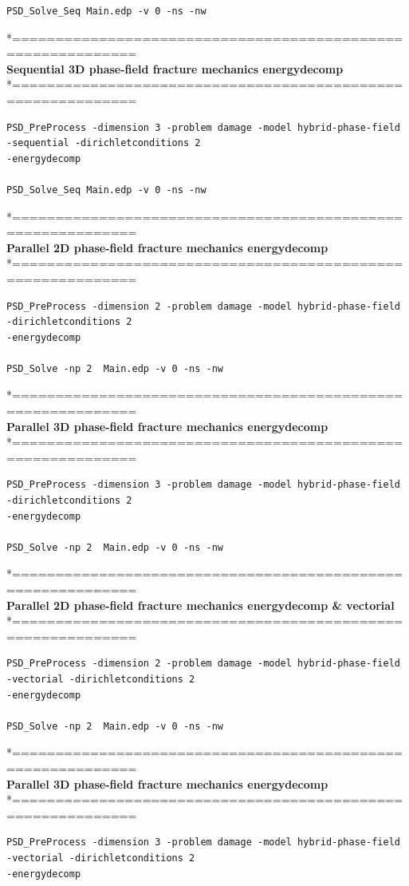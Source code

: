 {{\begin{lstlisting}[style=Linux]
PSD_Solve_Seq Main.edp -v 0 -ns -nw   
\end{lstlisting}
*============================================================\\
\textbf{ Sequential 3D phase-field fracture mechanics energydecomp }\\
*============================================================\\
\begin{lstlisting}[style=Linux]
PSD_PreProcess -dimension 3 -problem damage -model hybrid-phase-field -sequential -dirichletconditions 2 
-energydecomp   

PSD_Solve_Seq Main.edp -v 0 -ns -nw   
\end{lstlisting}
*============================================================\\
\textbf{ Parallel 2D phase-field fracture mechanics energydecomp }\\
*============================================================\\
\begin{lstlisting}[style=Linux]
PSD_PreProcess -dimension 2 -problem damage -model hybrid-phase-field -dirichletconditions 2 
-energydecomp   

PSD_Solve -np 2  Main.edp -v 0 -ns -nw   
\end{lstlisting}
*============================================================\\
\textbf{ Parallel 3D phase-field fracture mechanics energydecomp }\\
*============================================================\\
\begin{lstlisting}[style=Linux]
PSD_PreProcess -dimension 3 -problem damage -model hybrid-phase-field -dirichletconditions 2 
-energydecomp   

PSD_Solve -np 2  Main.edp -v 0 -ns -nw   
\end{lstlisting}
*============================================================\\
\textbf{ Parallel 2D phase-field fracture mechanics energydecomp \& vectorial}\\
*============================================================\\
\begin{lstlisting}[style=Linux]
PSD_PreProcess -dimension 2 -problem damage -model hybrid-phase-field -vectorial -dirichletconditions 2 
-energydecomp   

PSD_Solve -np 2  Main.edp -v 0 -ns -nw   
\end{lstlisting}
*============================================================\\
\textbf{ Parallel 3D phase-field fracture mechanics energydecomp }\\
*============================================================\\
\begin{lstlisting}[style=Linux]
PSD_PreProcess -dimension 3 -problem damage -model hybrid-phase-field -vectorial -dirichletconditions 2 
-energydecomp   


\end{lstlisting}}}
